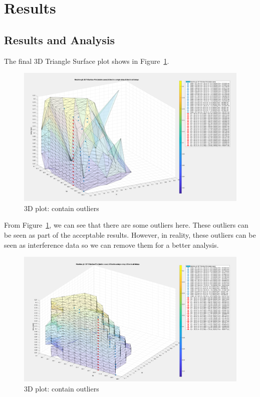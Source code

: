 \section{Results} %
\subsection{Results and Analysis} %
The final 3D Triangle Surface plot shows in Figure~\ref{5_4_1_Outlier}.\\

\begin{figure}[htbp]
\centering
\includegraphics[width = .819\textwidth]{figure/5_4_1_Outlier.png}
\caption{3D plot: contain outliers}
\label{5_4_1_Outlier}
\end{figure}

From Figure~\ref{5_4_1_Outlier}, we can see that there are some outliers here. These outliers can be seen as part of the acceptable results. However, in reality, these outliers can be seen as interference data so we can remove them for a better analysis.\\

\begin{figure}[htbp]
\centering
\includegraphics[width = .819\textwidth]{figure/5_4_1_without_Outlier1.png}
\caption{3D plot: contain outliers}
\label{5_4_1_without_Outlier1}
\end{figure}

